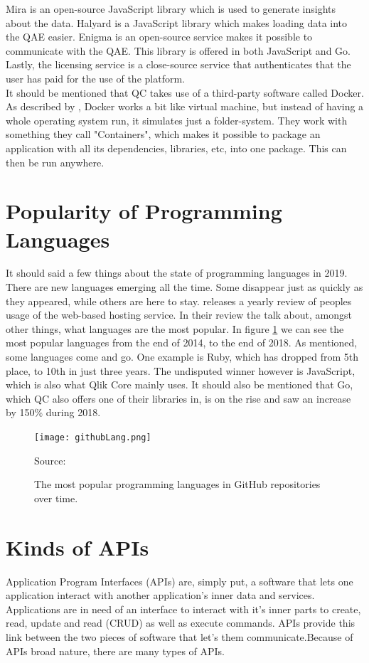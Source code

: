 \documentclass{cslthse-msc}
\newcommand{\source}[1]{\caption*{Source: {#1}} }
\begin{document}
    Mira is an open-source JavaScript library which is used to generate insights about the data. Halyard is a JavaScript library which makes loading data into the QAE easier. Enigma is an open-source service makes it possible to communicate with the QAE. This library is offered in both JavaScript and Go. Lastly, the licensing service is a close-source service that authenticates that the user has paid for the use of the platform.\\
    It should be mentioned that QC takes use of a third-party software called Docker. As described by \cite{whatisdocker}, Docker works a bit like virtual machine, but instead of having a whole operating system run, it simulates just a folder-system. They work with something they call "Containers", which makes it possible to package an application with all its dependencies, libraries, etc, into one package. This can then be run anywhere.
    \section{Popularity of Programming Languages}\label{sec:popLang}
    It should said a few things about the state of programming languages in 2019. There are new languages emerging all the time. Some disappear just as quickly as they appeared, while others are here to stay. \citet{github} releases a yearly review of peoples usage of the web-based hosting service. In their review the talk about, amongst other things, what languages are the most popular. In figure \ref{fig:githubLang} we can see the most popular languages from the end of 2014, to the end of 2018. As mentioned, some languages come and go. One example is Ruby, which has dropped from 5th place, to 10th in just three years. The undisputed winner however is JavaScript, which is also what Qlik Core mainly uses. It should also be mentioned that Go, which QC also offers one of their libraries in, is on the rise and saw an increase by 150\% during 2018.\citep{github}
    \begin{figure}[H]
        \centering
        \texttt{[image: githubLang.png]}
        \caption{The most popular programming languages in GitHub repositories over time.}
        \label{fig:githubLang}
        \source{\cite{github}}
    \end{figure}
    \section{Kinds of APIs}

    Application Program Interfaces (APIs) are, simply put, a software that
    lets one application interact with another application's inner data and
    services. Applications are in need of an interface to interact with it's
    inner parts to create, read, update and read (CRUD) as well as execute
    commands. APIs provide this link between the two pieces of software that let's
    them communicate.Because of APIs broad nature, there are many types of
    APIs.
\end{document}
